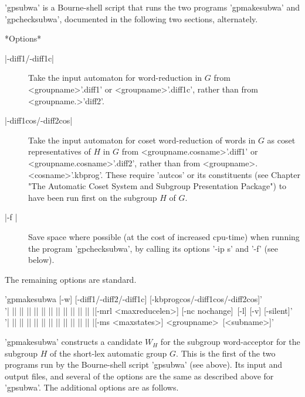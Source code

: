 'gpsubwa' is a Bourne-shell script that runs the two programs 'gpmakesubwa'
and 'gpchecksubwa', documented in the following two sections, alternately.

*Options*\\
\begin{description}
\item[|-diff1/-diff1c|] Take the input automaton for word-reduction in $G$
from <groupname>'.diff1' or <groupname>'.diff1c', rather than from
<groupname.>'diff2'.
\item[|-diff1cos/-diff2cos|] Take the input automaton for coset word-reduction
of words in $G$ as coset representatives of $H$ in $G$ from
<groupname.cosname>'.diff1' or <groupname.cosname>'.diff2', rather than from
<groupname>.<cosname>'.kbprog'. These require 'autcos' or its
constituents (see Chapter 
"The Automatic Coset System and Subgroup Presentation Package")
to have been run first on the subgroup $H$ of $G$.
\item[|-f |] Save space where possible (at the cost of increased cpu-time)
when running the program 'gpchecksubwa', by calling its options
'-ip s' and '-f' (see below).
\end{description}
The remaining options are standard.


'gpmakesubwa [-w] [-diff1/-diff2/-diff1c] [-kbprogcos/-diff1cos/-diff2cos]'\\
'| || || || || || || || || || || || |[-mrl <maxreducelen>] [-nc nochange]\
[-l] [-v] [-silent]'\\
'| || || || || || || || || || || || |[-ms <maxstates>] <groupname>\
[<subname>]'

'gpmakesubwa' constructs a candidate $W_H$ for the subgroup word-acceptor
for the subgroup $H$ of the short-lex automatic group $G$. This is the first
of the two programs run by the Bourne-shell script 'gpsubwa' (see above).
Its input and output files, and several of the options are the same as
described above for 'gpsubwa'. The additional options are as follows.


